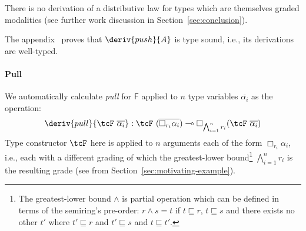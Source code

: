 There is no derivation of a distributive law for types which are themselves graded
modalities (see further work discussion in Section~\ref{sec:conclusion}).

The appendix~\cite{appendix} proves that
$\deriv{push}{A}$ is type sound, i.e., its derivations are well-typed.

\paragraph{Pull}
We automatically
calculate \emph{pull} for $\mathsf{F}$
applied to $n$ type variables
$\overline{\alpha_i}$
as the operation:
\begin{align*}
\deriv{pull}{\tcF\ \overline{\alpha_i}} : \tcF\ (\overline{\Box_{r_i} \alpha_i})
\multimap \Box_{\bigwedge^n_{i = 1} r_i} (\tcF\  \overline{\alpha_i})
 \end{align*}
Type constructor $\tcF$ here is applied to $n$
arguments each of the form $\Box_{r_i} \alpha_i$, i.e., each with a
different grading of which the greatest-lower bound\footnote{The greatest-lower bound $\wedge$ is partial operation which can be defined in terms of the semiring's pre-order: $r \wedge s = t$ if $t \sqsubseteq r$, $t \sqsubseteq s$ and there exists no other $t'$ where $t' \sqsubseteq r$ and $t' \sqsubseteq s$ and $t \sqsubseteq t'$.} $\bigwedge^n_{i =
  1} r_i$ is the resulting grade (see
 from Section~\ref{sec:motivating-example}).

